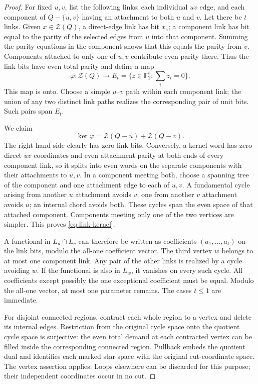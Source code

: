 \documentclass[11pt,a4paper]{article}
\numberwithin{equation}{section}
\theoremstyle{definition}
\theoremstyle{remark}
\newcommand{\F}{\mathbb F_2}
\newcommand{\cZ}{\mathcal Z}
\begin{document}
\begin{proof}
For fixed $u,v$, list the following links: each individual $uv$ edge, and each component of $Q-\{u,v\}$ having an attachment to both $u$ and $v$. Let there be $t$ links. Given $x\in\cZ(Q)$, a direct-edge link has bit $x_e$; a component link has bit equal to the parity of the selected edges from $u$ into that component. Summing the parity equations in the component shows that this equals the parity from $v$. Components attached to only one of $u,v$ contribute even parity there. Thus the link bits have even total parity and define a map
\[
 \varphi:\cZ(Q)\longrightarrow
 E_t=\{z\in\F^t:\textstyle\sum_i z_i=0\}.
\]
This map is onto. Choose a simple $u$--$v$ path within each component link; the union of any two distinct link paths realizes the corresponding pair of unit bits. Such pairs span $E_t$.

We claim
\begin{equation}\label{eq:link-kernel}
 \ker\varphi=\cZ(Q-u)+\cZ(Q-v).
\end{equation}
The right-hand side clearly has zero link bits. Conversely, a kernel word has zero direct $uv$ coordinates and even attachment parity at both ends of every component link, so it splits into even words on the separate components with their attachments to $u,v$. In a component meeting both, choose a spanning tree of the component and one attachment edge to each of $u,v$. A fundamental cycle arising from another $u$ attachment avoids $v$; one from another $v$ attachment avoids $u$; an internal chord avoids both. These cycles span the even space of that attached component. Components meeting only one of the two vertices are simpler. This proves \eqref{eq:link-kernel}.

A functional in $L_u\cap L_v$ can therefore be written as coefficients $(a_1,\ldots,a_t)$ on the link bits, modulo the all-one coefficient vector. The third vertex $w$ belongs to at most one component link. Any pair of the other links is realized by a cycle avoiding $w$. If the functional is also in $L_w$, it vanishes on every such cycle. All coefficients except possibly the one exceptional coefficient must be equal. Modulo the all-one vector, at most one parameter remains. The cases $t\le1$ are immediate.

For disjoint connected regions, contract each whole region to a vertex and delete its internal edges. Restriction from the original cycle space onto the quotient cycle space is surjective: the even total demand at each contracted vertex can be filled inside the corresponding connected region. Pullback embeds the quotient dual and identifies each marked star space with the original cut-coordinate space. The vertex assertion applies. Loops elsewhere can be discarded for this purpose; their independent coordinates occur in no cut.
\end{proof}
\end{document}
